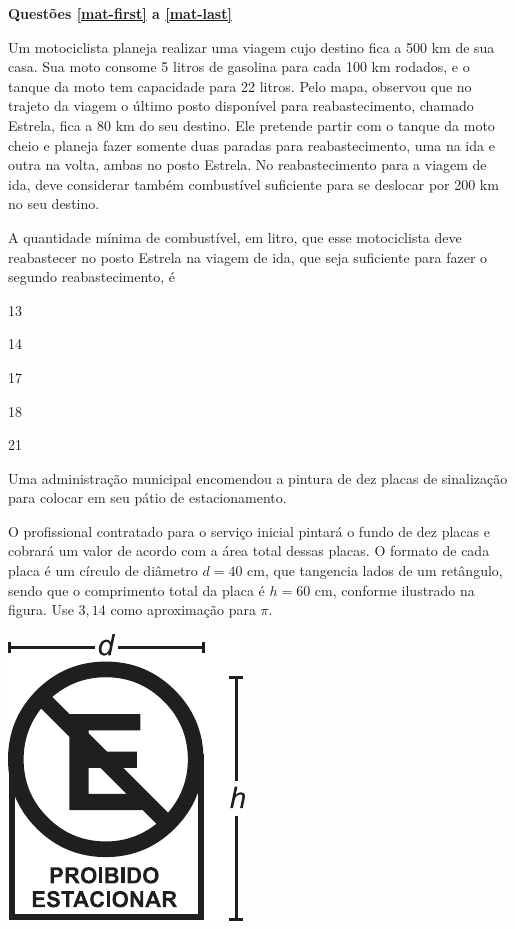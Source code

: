 \separador
{}

\noindent\textbf{Questões \ref{mat-first} a \ref{mat-last}} %

\questao %
Um motociclista planeja realizar uma viagem cujo
destino fica a 500 km de sua casa. Sua moto consome
5 litros de gasolina para cada 100 km rodados, e o
tanque da moto tem capacidade para 22 litros. Pelo
mapa, observou que no trajeto da viagem o último posto
disponível para reabastecimento, chamado Estrela, fica a
80 km do seu destino. Ele pretende partir com o tanque
da moto cheio e planeja fazer somente duas paradas para
reabastecimento, uma na ida e outra na volta, ambas no
posto Estrela. No reabastecimento para a viagem de ida,
deve considerar também combustível suficiente para se
deslocar por 200 km no seu destino.

A quantidade mínima de combustível, em litro, que
esse motociclista deve reabastecer no posto Estrela na
viagem de ida, que seja suficiente para fazer o segundo
reabastecimento, é

\begin{alternativas}
\item 13
\item 14
\item 17
\item 18
\item 21
\end{alternativas}

\questao
Uma administração municipal encomendou a pintura
de dez placas de sinalização para colocar em seu pátio
de estacionamento.

O profissional contratado para o serviço inicial
pintará o fundo de dez placas e cobrará um valor de
acordo com a área total dessas placas. O formato
de cada placa é um círculo de diâmetro $d = 40$ cm,
que tangencia lados de um retângulo, sendo que
o comprimento total da placa é $h = 60$ cm, conforme
ilustrado na figura. Use $3,14$ como aproximação para $\pi$.

\begin{center}
\includegraphics[width=.2\textwidth]{subareas/matematica/enem_2019-151-desenho.pdf}
\end{center}

